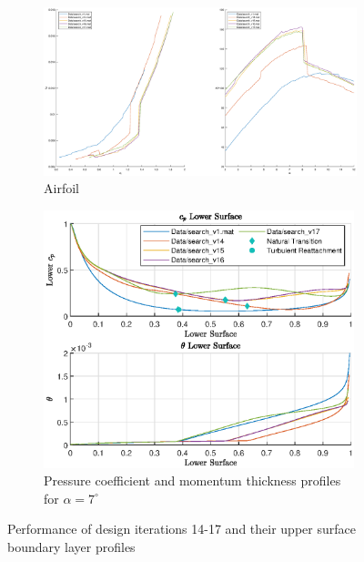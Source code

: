 \documentclass{article}
\begin{document}
\begin{figure}[H]
    \centering
    \begin{subfigure}{0.45\textwidth}
        \centering
        \includegraphics[width=1.2\textwidth, center]{figures/hiRe_lod_17.eps}
        \caption{Airfoil}
        \label{fig:v17_lod}
    \end{subfigure}
    \begin{subfigure}{0.54\textwidth}
        \centering
        \includegraphics[width=0.99\textwidth]{figures/hiRe_lowerprofile_17_a7.eps}
        \caption{Pressure coefficient and momentum thickness profiles for $\alpha = 7^\circ$}
        \label{fig:v17_lprofile}
    \end{subfigure}
    \caption{Performance of design iterations 14-17 and their upper surface boundary layer profiles}
\end{figure}
\end{document}
